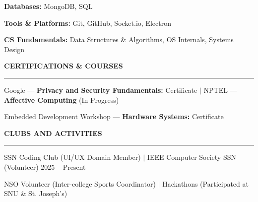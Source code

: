 \documentclass[11pt]{article}
\newcommand{\sectionhead}[1]{{\color{darkblue}\fontsize{12pt}{12pt}\selectfont\textbf{#1}}\vspace{4pt}\hrule\vspace{6pt}}
\begin{document}
\textbf{Databases:} MongoDB, SQL

\textbf{Tools \& Platforms:} Git, GitHub, Socket.io, Electron

\textbf{CS Fundamentals:} Data Structures \& Algorithms, OS Internals, Systems Design

\vspace{6pt}

\sectionhead{CERTIFICATIONS \& COURSES}

Google — \textbf{Privacy and Security Fundamentals:} Certificate \quad $|$ \quad NPTEL — \textbf{Affective Computing} (In Progress)

Embedded Development Workshop — \textbf{Hardware Systems:} Certificate

\vspace{6pt}

\sectionhead{CLUBS AND ACTIVITIES}

SSN Coding Club (UI/UX Domain Member) $|$ IEEE Computer Society SSN (Volunteer) \hfill 2025 – Present

NSO Volunteer (Inter-college Sports Coordinator) $|$ Hackathons (Participated at SNU \& St. Joseph's)
\end{document}
